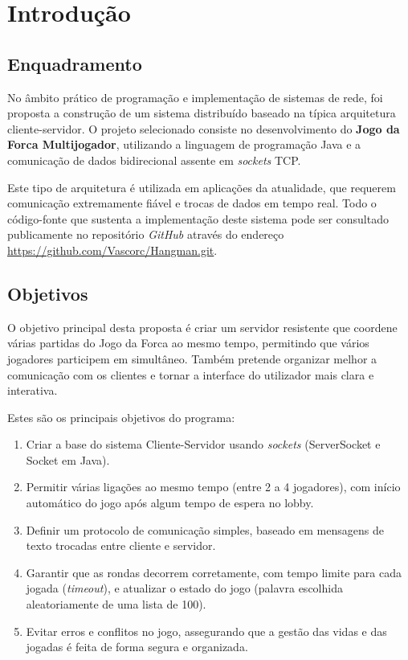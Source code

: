 \documentclass[11pt,a4paper,oneside]{report}
\begin{document}
\chapter{Introdução}

\section{Enquadramento}
No âmbito prático de programação e implementação de sistemas de rede, foi proposta a construção de um sistema distribuído baseado na típica arquitetura cliente-servidor. O projeto selecionado consiste no desenvolvimento  do \textbf{Jogo da Forca Multijogador}, utilizando a linguagem de programação Java e a comunicação de dados bidirecional assente em \textit{sockets} TCP.

Este tipo de arquitetura é utilizada em aplicações da atualidade, que requerem comunicação extremamente fiável e trocas de dados em tempo real. Todo o código-fonte que sustenta a implementação deste sistema pode ser consultado publicamente no repositório \textit{GitHub} através do endereço \url{https://github.com/Vascorc/Hangman.git}.


\section{Objetivos}
O objetivo principal desta proposta é criar um servidor resistente que coordene várias partidas do Jogo da Forca ao mesmo tempo, permitindo que vários jogadores participem em simultâneo. Também pretende organizar melhor a comunicação com os clientes e tornar a interface do utilizador mais clara e interativa.

Estes são os principais objetivos do programa:
\begin{enumerate}
    \item Criar a base do sistema Cliente-Servidor usando \textit{sockets} (ServerSocket e Socket em Java). 
    \item Permitir várias ligações ao mesmo tempo (entre 2 a 4 jogadores), com início automático do jogo após algum tempo de espera no lobby.
    \item Definir um protocolo de comunicação simples, baseado em mensagens de texto trocadas entre cliente e servidor.
    \item Garantir que as rondas decorrem corretamente, com tempo limite para cada jogada (\textit{timeout}), e atualizar o estado do jogo (palavra escolhida aleatoriamente de uma lista de 100).
    \item Evitar erros e conflitos no jogo, assegurando que a gestão das vidas e das jogadas é feita de forma segura e organizada.
\end{enumerate}
\end{document}
